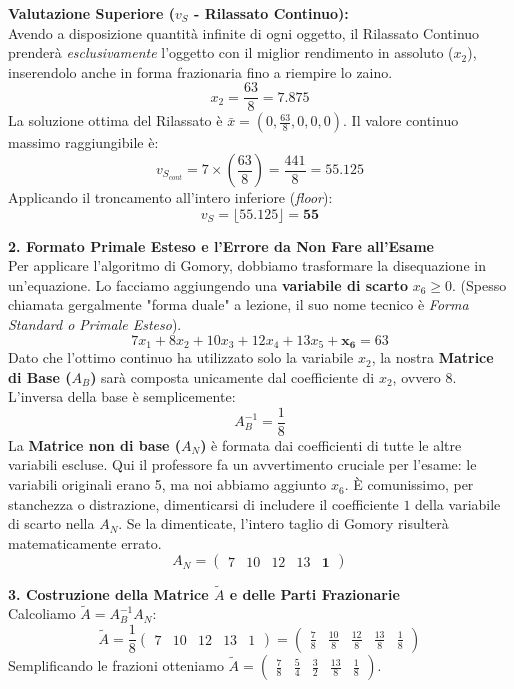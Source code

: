 \documentclass[12pt, a4paper]{article}
\begin{document}
	\textbf{Valutazione Superiore ($v_S$ - Rilassato Continuo):}\\
	Avendo a disposizione quantità infinite di ogni oggetto, il Rilassato Continuo prenderà \textit{esclusivamente} l'oggetto con il miglior rendimento in assoluto ($x_2$), inserendolo anche in forma frazionaria fino a riempire lo zaino.
	\[
	x_2 = \frac{63}{8} = 7.875
	\]
	La soluzione ottima del Rilassato è $\bar{x} = \left(0, \frac{63}{8}, 0, 0, 0\right)$.
	Il valore continuo massimo raggiungibile è:
	\[
	v_{S_{cont}} = 7 \times \left(\frac{63}{8}\right) = \frac{441}{8} = 55.125
	\]
	Applicando il troncamento all'intero inferiore (\textit{floor}):
	\[
	v_S = \lfloor 55.125 \rfloor = \mathbf{55}
	\]
	
	\vspace{0.4cm}
	\textbf{2. Formato Primale Esteso e l'Errore da Non Fare all'Esame}\\
	Per applicare l'algoritmo di Gomory, dobbiamo trasformare la disequazione in un'equazione. Lo facciamo aggiungendo una \textbf{variabile di scarto} $x_6 \geq 0$. (Spesso chiamata gergalmente "forma duale" a lezione, il suo nome tecnico è \textit{Forma Standard o Primale Esteso}).
	\[
	7x_1 + 8x_2 + 10x_3 + 12x_4 + 13x_5 + \mathbf{x_6} = 63
	\]
	Dato che l'ottimo continuo ha utilizzato solo la variabile $x_2$, la nostra \textbf{Matrice di Base ($A_B$)} sarà composta unicamente dal coefficiente di $x_2$, ovvero $8$.
	L'inversa della base è semplicemente:
	\[
	A_B^{-1} = \frac{1}{8}
	\]
	La \textbf{Matrice non di base ($A_N$)} è formata dai coefficienti di tutte le altre variabili escluse.
	Qui il professore fa un avvertimento cruciale per l'esame: le variabili originali erano 5, ma noi abbiamo aggiunto $x_6$. È comunissimo, per stanchezza o distrazione, dimenticarsi di includere il coefficiente $1$ della variabile di scarto nella $A_N$. Se la dimenticate, l'intero taglio di Gomory risulterà matematicamente errato.
	\[
	A_N = \begin{pmatrix} 7 & 10 & 12 & 13 & \mathbf{1} \end{pmatrix}
	\]
	
	\vspace{0.4cm}
	\textbf{3. Costruzione della Matrice $\tilde{A}$ e delle Parti Frazionarie}\\
	Calcoliamo $\tilde{A} = A_B^{-1} A_N$:
	\[
	\tilde{A} = \frac{1}{8} \begin{pmatrix} 7 & 10 & 12 & 13 & 1 \end{pmatrix} = \begin{pmatrix} \frac{7}{8} & \frac{10}{8} & \frac{12}{8} & \frac{13}{8} & \frac{1}{8} \end{pmatrix}
	\]
	Semplificando le frazioni otteniamo $\tilde{A} = \begin{pmatrix} \frac{7}{8} & \frac{5}{4} & \frac{3}{2} & \frac{13}{8} & \frac{1}{8} \end{pmatrix}$.
	
\end{document}
